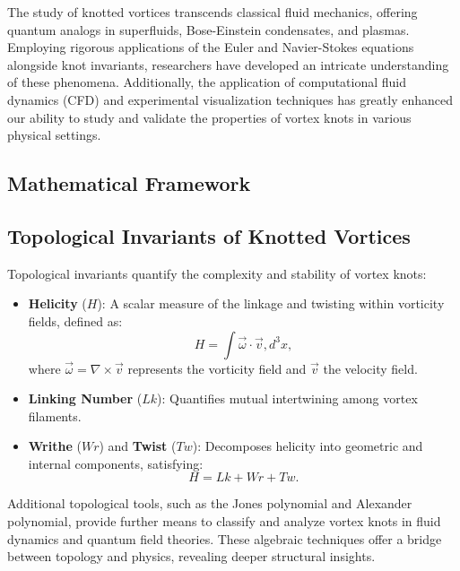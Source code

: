 \documentclass[a4paper,10pt]{article}
\begin{document}
The study of knotted vortices transcends classical fluid mechanics, offering quantum analogs in superfluids, Bose-Einstein condensates, and plasmas. Employing rigorous applications of the Euler and Navier-Stokes equations alongside knot invariants, researchers have developed an intricate understanding of these phenomena. Additionally, the application of computational fluid dynamics (CFD) and experimental visualization techniques has greatly enhanced our ability to study and validate the properties of vortex knots in various physical settings.


\subsection*{Mathematical Framework}


\subsection*{Topological Invariants of Knotted Vortices}


Topological invariants quantify the complexity and stability of vortex knots:


\begin{itemize}

\item 
\textbf{Helicity} ($H$): A scalar measure of the linkage and twisting within vorticity fields, defined as:
\begin{equation*}
H = \int \vec{\omega} \cdot \vec{v} , d^3x,
\end{equation*}
where $\vec{\omega} = \nabla \times \vec{v}$ represents the vorticity field and $\vec{v}$ the velocity field.




\item 
\textbf{Linking Number} ($Lk$): Quantifies mutual intertwining among vortex filaments.




\item 
\textbf{Writhe} ($Wr$) and \textbf{Twist} ($Tw$): Decomposes helicity into geometric and internal components, satisfying:
\begin{equation*}
H = Lk + Wr + Tw.
\end{equation*}




\end{itemize}

Additional topological tools, such as the Jones polynomial and Alexander polynomial, provide further means to classify and analyze vortex knots in fluid dynamics and quantum field theories. These algebraic techniques offer a bridge between topology and physics, revealing deeper structural insights.
\end{document}
